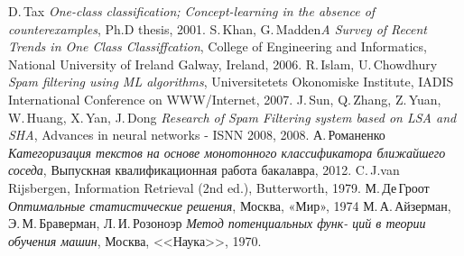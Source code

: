 \begin{thebibliography}{99}

 D.\,Tax  \textit{One-class classification; Concept-learning in the absence of
counterexamples}, Ph.D thesis, 2001.
 S.\,Khan, G.\,Madden\textit{A Survey of Recent Trends in One Class
Classiffcation}, College of Engineering and Informatics, National University of Ireland Galway,
Ireland, 2006.
 R.\,Islam, U.\,Chowdhury \textit{Spam filtering using ML algorithms}, Universitetets Okonomiske Institute, IADIS International Conference on WWW/Internet, 2007.
 J.\,Sun, Q.\,Zhang, Z.\,Yuan, W.\,Huang, X.\,Yan, J.\,Dong \textit{Research of Spam Filtering system based on LSA and SHA}, Advances in neural networks - ISNN 2008, 2008.
 А.\,Романенко  \textit{Категоризация текстов на основе монотонного
классификатора ближайшего соседа}, Выпускная квалификационная работа бакалавра, 2012.
 C.\,J.van\,Rijsbergen, Information Retrieval (2nd ed.), Butterworth, 1979.
М.\,Де\,Гроот \textit{Оптимальные статистические решения}, Москва, «Мир», 1974
 М.\,А.\,Айзерман, Э.\,М.\,Браверман, Л.\,И.\,Розоноэр \textit{Метод потенциальных функ-
ций в теории обучения машин}, Москва, <<Наука>>, 1970.

\end{thebibliography}